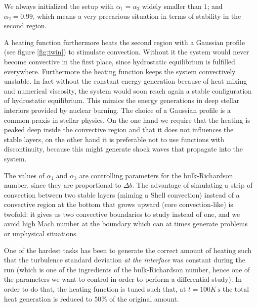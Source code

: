 We always initialized the setup with $\alpha_{1} = \alpha_{3}$ widely smaller than $1$; and $\alpha_{2}=0.99$, which means a very precarious situation in terms of stability in the second region. 

A heating function furthermore heats the second region with a Gaussian profile (see figure \ref{fig:twin}) to stimulate convection. Without it the system would never become convective in the first place, since hydrostatic equilibrium is fulfilled everywhere. Furthermore the heating function keeps the system convectively unstable. In fact without the constant energy generation because of heat mixing and numerical viscosity, the system would soon reach again a stable configuration of hydrostatic equilibrium. This mimics the energy generations in deep stellar interiors provided by nuclear burning. The choice of a Gaussian profile is a common praxis in stellar physics. On the one hand we require that the heating is peaked deep inside the convective region and that it does not influences the stable layers, on the other hand it is preferable not to use functions with discontinuity, because this might generate shock waves that propagate into the system.

The values of $\alpha_{1}$ and $\alpha_{3}$ are controlling parameters for the bulk-Richardson number, since they are proportional to $\Delta b$. The advantage of simulating a strip of convection between two stable layers (miming a Shell convection) instead of a convective region at the bottom that grows upward (core convection-like) is twofold: it gives us two convective boundaries to study instead of one, and we avoid high Mach number at the boundary which can at times generate problems or unphysical situations. 

One of the hardest tasks has been to generate the correct amount of heating such that the turbulence standard deviation \textit{at the interface} was constant during the run (which is one of the ingredients of the bulk-Richardson number, hence one of the parameters we want to control in order to perform a differential study). In order to do that, the heating function is tuned such that, at $t=100K \ \mathrm{s}$ the total heat generation is reduced to $50 \%$ of the original amount.

